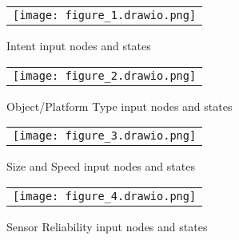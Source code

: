 
\begin{figure} [ht]
    \begin{center}
    \begin{tabular}{c} %
    \texttt{[image: figure\_1.drawio.png]}
    \end{tabular}
    \end{center}
    \caption[example] 
    { \label{fig:1_intent} Intent input nodes and states}
    \end{figure}
 
 
    \begin{figure} [ht]
     \begin{center}
     \begin{tabular}{c} %
     \texttt{[image: figure\_2.drawio.png]}
     \end{tabular}
     \end{center}
     \caption[example] 
     { \label{fig:2_objects} Object/Platform Type input nodes and states}
     \end{figure}
     



     \begin{figure} [ht]
        \begin{center}
        \begin{tabular}{c} %
        \texttt{[image: figure\_3.drawio.png]}
        \end{tabular}
        \end{center}
        \caption[example] 
        { \label{fig:3_size_speed} Size and Speed input nodes and states}
        \end{figure}




\begin{figure} [ht]
    \begin{center}
    \begin{tabular}{c} %
    \texttt{[image: figure\_4.drawio.png]}
    \end{tabular}
    \end{center}
    \caption[example] 
    { \label{fig:4_reliability} Sensor Reliability input nodes and states}
    \end{figure}




